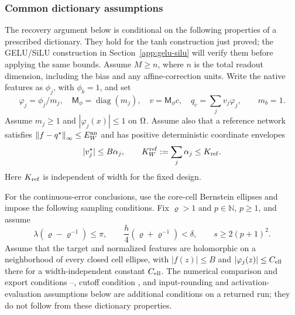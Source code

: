 \subsubsection{Common dictionary assumptions}
The recovery argument below is conditional on the following properties of a
prescribed dictionary. They hold for the tanh construction just proved; the
GELU/SiLU construction in Section~\ref{app:gelu-silu} will verify them before
applying the same bounds.
Assume $M\ge n$, where $n$ is the total readout dimension, including the bias
and any affine-correction units. Write the native features as $\phi_j$, with
$\phi_b=1$, and set
\begin{equation}
 \varphi_j=\phi_j/m_j,\quad
 \mathsf M_\phi=\operatorname{diag}(m_j),\quad v=\mathsf M_\phi c,
 \quad q_c=\sum_jv_j\varphi_j,
 \qquad m_b=1.
 \label{eq:normalized-dictionary}
\end{equation}
Assume $m_j\ge1$ and $|\varphi_j(x)|\le1$ on $\Omega$. Assume also that a
reference network satisfies $\left\lVert f-q^\star\right\rVert_\infty\le E_W^{\rm an}$ and
has positive deterministic coordinate envelopes
\begin{equation}
 |v_j^\star|\le B\alpha_j,\qquad
 K_W^{\rm ref}:=\sum_j\alpha_j\le K_{\rm ref}.
 \label{eq:coordinate-envelope}
\end{equation}
Here $K_{\rm ref}$ is independent of width for the fixed design.

For the continuous-error conclusions, use the core-cell Bernstein ellipses
and impose the following sampling conditions.
Fix $\varrho>1$ and $p\in\mathbb N$, $p\ge1$, and assume
\begin{equation}
 \lambda(\varrho-\varrho^{-1})\le\pi,\qquad
 \frac h4(\varrho+\varrho^{-1})<\delta,\qquad s\ge2(p+1)^2.
 \label{eq:sampling-conditions}
\end{equation}
Assume that the target and normalized features are holomorphic on a
neighborhood of every closed cell ellipse, with $|f(z)|\le B$ and
$|\varphi_j(z)|\le C_{\rm ell}$ there for a width-independent constant
$C_{\rm ell}$. The numerical comparison and export conditions
--, cutoff condition
, and input-rounding and activation-evaluation assumptions
below are additional conditions on a returned run; they do not follow from
these dictionary properties.

